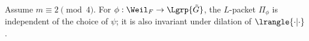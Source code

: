 \documentclass[a4paper,10pt]{article}
\begin{document}
\begin{theorem}\label{prop:packet-independence}
	Assume $m \equiv 2 \pmod 4$. For $\phi: \Weil_F \to \Lgrp{\tilde{G}}$, the $L$-packet $\Pi_\phi$ is independent of the choice of $\psi$; it is also invariant under dilation of $\lrangle{\cdot|\cdot}$.
\end{theorem}
\end{document}
